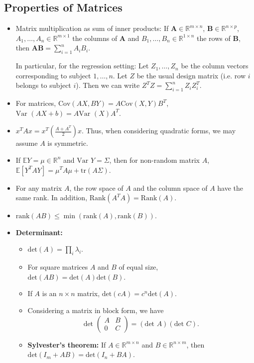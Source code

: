 \documentclass[twoside]{article}
\newcommand{\dis}{\displaystyle}
\newcommand\bbE{\mathbb{E}}
\newcommand\bbR{\mathbb{R}}
\newcommand\lmb{\lambda}
\newcommand\Sg{\Sigma}
\newcommand\var{\text{Var }}
\begin{document}
\subsection{Properties of Matrices}
\begin{itemize}
\item Matrix multiplication as sum of inner products: If $\mathbf{A} \in \bbR^{m \times n}$, $\mathbf{B} \in \bbR^{n \times p}$, $A_1, \dots, A_n \in \bbR^{m \times 1}$ the columns of $\mathbf{A}$ and $B_1, \dots, B_n \in \bbR^{1 \times n}$ the rows of $\mathbf{B}$, then $\mathbf{AB} = \displaystyle\sum_{i=1}^n A_i B_i$.

In particular, for the regression setting: Let $Z_1, \dots, Z_n$ be the column vectors corresponding to subject $1, \dots, n$. Let $Z$ be the usual design matrix (i.e. row $i$ belongs to subject $i$). Then we can write $Z^T Z = \dis\sum_{i=1}^n Z_i Z_i^T$.

\item For matrices, $\text{Cov} (AX, BY) = A \text{Cov} (X, Y) B^T$, $\var (AX + b) = A \var (X) A^T$.

\item $x^T A x = x^T \left( \displaystyle\frac{A + A^T}{2} \right) x$. Thus, when considering quadratic forms, we may assume $A$ is symmetric.

\item If $\bbE Y = \mu \in \bbR^n$ and $\var Y = \Sg$, then for non-random matrix $A$, $\bbE [Y^T A Y] = \mu^T A \mu + \text{tr}(A \Sg)$.

\item For any matrix $A$, the row space of $A$ and the column space of $A$ have the same rank. In addition, $\text{Rank}(A^T A) = \text{Rank}(A)$.

\item $\text{rank}(AB) \leq \min (\text{rank}(A), \text{rank}(B))$.

\item \textbf{Determinant:}
\begin{itemize}
\item $\text{det}(A) = \prod_i \lmb_i$.
\item For square matrices $A$ and $B$ of equal size, $\text{det}(AB) = \text{det}(A)\text{det}(B)$.
\item If $A$ is an $n \times n$ matrix, $\text{det}(cA) = c^n \text{det}(A)$.
\item Considering a matrix in block form, we have
\begin{equation*}
\text{det } \begin{pmatrix} A & B \\ 0 & C \end{pmatrix} = (\text{det } A)(\text{det } C).
\end{equation*}
\item \textbf{Sylvester's theorem:} If $A \in \bbR^{m \times n}$ and $B \in \bbR^{n \times m}$, then $\text{det} (I_m + AB) = \text{det}(I_n + BA)$.
\end{itemize}


\end{itemize}
\end{document}
